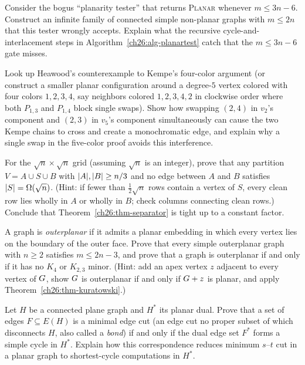 \begin{exercise}
Consider the bogus ``planarity tester'' that returns \textsc{Planar} whenever $m \le 3n - 6$.
Construct an infinite family of connected simple non-planar graphs with $m \le 2n$ that
this tester wrongly accepts. Explain what the recursive cycle-and-interlacement steps in
Algorithm~\ref{ch26:alg-planartest} catch that the $m \le 3n - 6$ gate misses.
\end{exercise}

\begin{exercise}
Look up Heawood's counterexample to Kempe's four-color argument (or construct a smaller
planar configuration around a degree-$5$ vertex colored with four colors $1,2,3,4$, say
neighbors colored $1,2,3,4,2$ in clockwise order where both $P_{1,3}$ and $P_{1,4}$ block
single swaps). Show how swapping $(2,4)$ in $v_2$'s component and $(2,3)$ in $v_5$'s component
simultaneously can cause the two Kempe chains to cross and create a monochromatic edge, and
explain why a single swap in the five-color proof avoids this interference.
\end{exercise}

\begin{exercise}
For the $\sqrt n \times \sqrt n$ grid (assuming $\sqrt n$ is an integer), prove that any
partition $V = A\cup S\cup B$ with $\lvert A\rvert,\lvert B\rvert\ge n/3$ and no edge between $A$ and $B$
satisfies $\lvert S\rvert = \Omega(\sqrt n)$. (Hint: if fewer than $\frac{1}{2}\sqrt n$ rows contain a
vertex of $S$, every clean row lies wholly in $A$ or wholly in $B$; check columns connecting
clean rows.) Conclude that Theorem~\ref{ch26:thm-separator} is tight up to a constant factor.
\end{exercise}

\begin{exercise}
A graph is \emph{outerplanar} if it admits a planar embedding in which every vertex lies on
the boundary of the outer face. Prove that every simple outerplanar graph with $n \ge 2$
satisfies $m \le 2n - 3$, and prove that a graph is outerplanar if and only if it has no
$K_4$ or $K_{2,3}$ minor. (Hint: add an apex vertex $z$ adjacent to every vertex of $G$,
show $G$ is outerplanar if and only if $G + z$ is planar, and apply Theorem~\ref{ch26:thm-kuratowski}.)
\end{exercise}

\begin{exercise}
Let $H$ be a connected plane graph and $H^\ast$ its planar dual. Prove that a set of edges
$F \subseteq E(H)$ is a minimal edge cut (an edge cut no proper subset of which disconnects
$H$, also called a \emph{bond}) if and only if the dual edge set $F^\ast$ forms a simple
cycle in $H^\ast$. Explain how this correspondence reduces minimum $s$--$t$ cut in a planar
graph to shortest-cycle computations in $H^\ast$.
\end{exercise}
